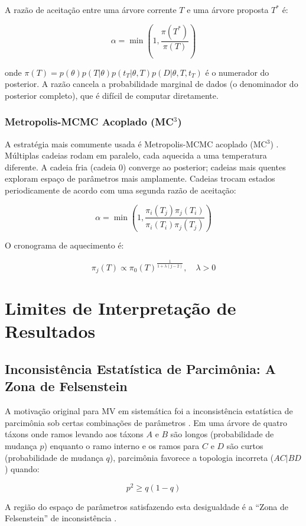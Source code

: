 A razão de aceitação entre uma árvore corrente $T$ e uma árvore proposta $T^*$ é:

$$\alpha = \min\left(1, \frac{\pi(T^{*})}{\pi(T)}\right)$$

onde $\pi(T) = p(\theta) p(T|\theta) p(t_T|\theta, T) p(D|\theta, T, t_T)$ é o numerador do posterior. A razão cancela a probabilidade marginal de dados (o denominador do posterior completo), que é difícil de computar diretamente.

\subsubsection{Metropolis-MCMC Acoplado (MC$^3$)}

A estratégia mais comumente usada é Metropolis-MCMC acoplado (MC$^3$) \parencite{geyer1991}. Múltiplas cadeias rodam em paralelo, cada aquecida a uma temperatura diferente. A cadeia fria (cadeia 0) converge ao posterior; cadeias mais quentes exploram espaço de parâmetros mais amplamente. Cadeias trocam estados periodicamente de acordo com uma segunda razão de aceitação:

$$\alpha = \min\left(1, \frac{\pi_i(T_j) \pi_j(T_i)}{\pi_i(T_i) \pi_j(T_j)} \right)$$

O cronograma de aquecimento é:

$$\pi_j(T) \propto \pi_0(T)^{\frac{1}{1+\lambda(j-2)}}, \quad \lambda > 0$$

\section{Limites de Interpretação de Resultados}

\subsection{Inconsistência Estatística de Parcimônia: A Zona de Felsenstein}

A motivação original para MV em sistemática foi a inconsistência estatística de parcimônia sob certas combinações de parâmetros \parencite{felsenstein1978}. Em uma árvore de quatro táxons onde ramos levando aos táxons $A$ e $B$ são longos (probabilidade de mudança $p$) enquanto o ramo interno e os ramos para $C$ e $D$ são curtos (probabilidade de mudança $q$), parcimônia favorece a topologia incorreta ($AC|BD$) quando:

$$p^2 \geq q(1-q)$$

A região do espaço de parâmetros satisfazendo esta desigualdade é a ``Zona de Felsenstein'' de inconsistência \parencite{wheeler2012}.

